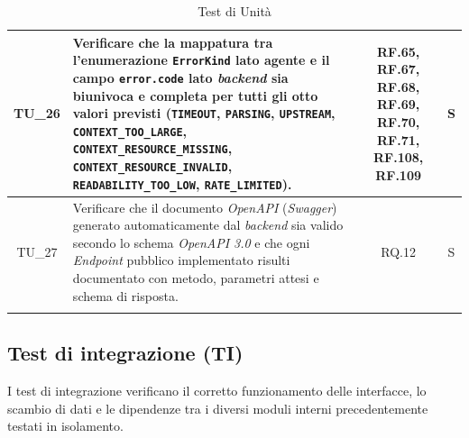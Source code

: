 \documentclass[12pt, a4paper]{article}
\newlength{\LargColVal} %
\begin{document}
\begin{xltabular}{\textwidth}{|c|X|C{\LargColVal}|C{\LargColVal}|}
    TU\_26 & Verificare che la mappatura tra l'enumerazione \texttt{ErrorKind} lato agente e il campo \texttt{error.code} lato \textit{backend} sia biunivoca e completa per tutti gli otto valori previsti (\texttt{TIMEOUT}, \texttt{PARSING}, \texttt{UPSTREAM}, \texttt{CONTEXT\_TOO\_LARGE}, \texttt{CONTEXT\_RESOURCE\_MISSING}, \texttt{CONTEXT\_RESOURCE\_INVALID}, \texttt{READABILITY\_TOO\_LOW}, \texttt{RATE\_LIMITED}). & RF.65, RF.67, RF.68, RF.69, RF.70, RF.71, RF.108, RF.109 & S \\ \hline

    TU\_27 & Verificare che il documento \textit{OpenAPI} (\textit{Swagger}) generato automaticamente dal \textit{backend} sia valido secondo lo schema \textit{OpenAPI 3.0} e che ogni \textit{Endpoint} pubblico implementato risulti documentato con metodo, parametri attesi e schema di risposta. & RQ.12 & S \\ \hline

    \caption{Test di Unità}
    \label{tab:test_unita}
\end{xltabular}

\subsection{Test di integrazione (TI)}
I test di integrazione verificano il corretto funzionamento delle interfacce, lo scambio di dati e le dipendenze tra i diversi moduli interni precedentemente testati in isolamento.
\end{document}
